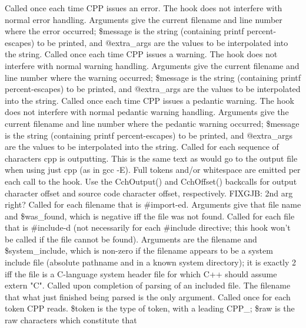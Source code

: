 Called once each time CPP issues an error.  The hook does not interfere
with normal error handling.  Arguments give the current filename and line
number where the error occurred;  \$message is the string (containing printf
percent-escapes) to be printed, and @extra\_\-args are the values to be 
interpolated into the string.
Called once each time CPP issues a warning.  The hook does not interfere
with normal warning handling.  Arguments give the current filename and line
number where the warning occurred;  \$message is the string (containing printf
percent-escapes) to be printed, and @extra\_\-args are the values to be 
interpolated into the string.
Called once each time CPP issues a pedantic warning.  The hook does not interfere
with normal pedantic warning handling.  Arguments give the current filename and line
number where the pedantic warning occurred;  \$message is the string (containing printf
percent-escapes) to be printed, and @extra\_\-args are the values to be 
interpolated into the string.
Called for each sequence of characters cpp is outputting.  This is the
same text as would go to the output file when using just cpp (as in gcc -E).
Full tokens and/or whitespace are emitted per each call to the hook.
Use the CchOutput() and CchOffset() backcalls for output character offset
and source code character offset, respectively.
 FIXGJB: 2nd arg right?
Called for each filename that is \#import-ed.  Arguments give that
file name and \$was\_\-found, which is negative iff the file was not found.
Called for each file that is \#include-d (not necessarily for each \#include
directive; this hook won't be called if the file cannot be found).
Arguments are the filename and \$system\_\-include, which is non-zero if the filename
appears to be a system include file (absolute pathname and in a known
system directory);  it is exactly 2 iff the file is a C-language
system header file for which C++ should assume extern "C".
Called upon completion of parsing of an included file.  The filename
that what just finished being parsed is the only argument.
Called once for each token CPP reads.  \$token is the type of token,
with a leading CPP\_\-; \$raw is the raw characters which constitute that
